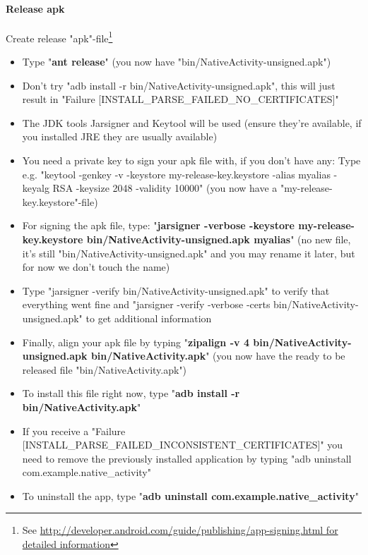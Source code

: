 \paragraph{Release apk}
Create release "apk"-file\footnote{See \url{http://developer.android.com/guide/publishing/app-signing.html for detailed information}}
\begin{itemize}
\item{Type "\textbf{ant release}" (you now have "bin/NativeActivity-unsigned.apk")}
\item{\textrightarrow  Don't try "adb install -r bin/NativeActivity-unsigned.apk", this will just result in "Failure [INSTALL\_PARSE\_FAILED\_NO\_CERTIFICATES]"}
\item{\textrightarrow  The JDK tools Jarsigner and Keytool will be used (ensure they're available, if you installed JRE they are usually available)}
\item{\textrightarrow  You need a private key to sign your apk file with, if you don't have any: Type e.g. "keytool -genkey -v -keystore my-release-key.keystore -alias myalias -keyalg RSA -keysize 2048 -validity 10000" (you now have a "my-release-key.keystore"-file)}
\item{For signing the apk file, type: "\textbf{jarsigner -verbose -keystore my-release-key.keystore bin/NativeActivity-unsigned.apk myalias}" (no new file, it's still "bin/NativeActivity-unsigned.apk" and you may rename it later, but for now we don't touch the name)}
\item{\textrightarrow  Type "jarsigner -verify bin/NativeActivity-unsigned.apk" to verify that everything went fine and "jarsigner -verify -verbose -certs bin/NativeActivity-unsigned.apk" to get additional information}
\item{Finally, align your apk file by typing "\textbf{zipalign -v 4 bin/NativeActivity-unsigned.apk bin/NativeActivity.apk}" (you now have the ready to be released file "bin/NativeActivity.apk")}
\item{To install this file right now, type "\textbf{adb install -r bin/NativeActivity.apk}"}
\item{\textrightarrow  If you receive a "Failure [INSTALL\_PARSE\_FAILED\_INCONSISTENT\_CERTIFICATES]" you need to remove the previously installed application by typing "adb uninstall com.example.native\_activity"}
\item{\textrightarrow  To uninstall the app, type "\textbf{adb uninstall com.example.native\_activity}"}
\end{itemize}




